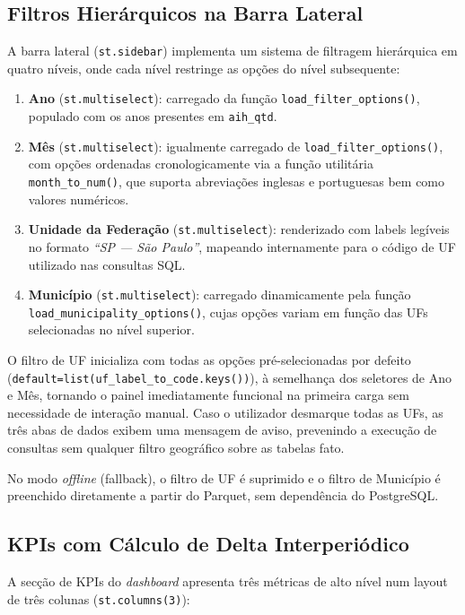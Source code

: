 \documentclass[12pt,a4paper]{report}
\begin{document}
\subsection{Filtros Hierárquicos na Barra Lateral}

A barra lateral (\texttt{st.sidebar}) implementa um sistema de filtragem hierárquica
em quatro níveis, onde cada nível restringe as opções do nível subsequente:

\begin{enumerate}
    \item \textbf{Ano} (\texttt{st.multiselect}): carregado da função
    \texttt{load\_filter\_options()}, populado com os anos presentes em
    \texttt{aih\_qtd}.
    \item \textbf{Mês} (\texttt{st.multiselect}): igualmente carregado de
    \texttt{load\_filter\_options()}, com opções ordenadas cronologicamente via a
    função utilitária \texttt{month\_to\_num()}, que suporta abreviações inglesas
    e portuguesas bem como valores numéricos.
    \item \textbf{Unidade da Federação} (\texttt{st.multiselect}): renderizado com
    labels legíveis no formato \textit{``SP — São Paulo''}, mapeando internamente
    para o código de UF utilizado nas consultas SQL.
    \item \textbf{Município} (\texttt{st.multiselect}): carregado dinamicamente pela
    função \texttt{load\_municipality\_options()}, cujas opções variam em função das
    UFs selecionadas no nível superior.
\end{enumerate}

O filtro de UF inicializa com todas as opções pré-selecionadas por defeito
(\texttt{default=list(uf\_label\_to\_code.keys())}), à semelhança dos seletores de
Ano e Mês, tornando o painel imediatamente funcional na primeira carga sem necessidade
de interação manual. Caso o utilizador desmarque todas as UFs, as três abas de dados
exibem uma mensagem de aviso, prevenindo a execução de consultas sem qualquer filtro
geográfico sobre as tabelas fato.

No modo \textit{offline} (fallback), o filtro de UF é suprimido e o filtro de
Município é preenchido diretamente a partir do Parquet, sem dependência do PostgreSQL.

\subsection{KPIs com Cálculo de Delta Interperiódico}

A secção de KPIs do \textit{dashboard} apresenta três métricas de alto nível num
layout de três colunas (\texttt{st.columns(3)}):
\end{document}

